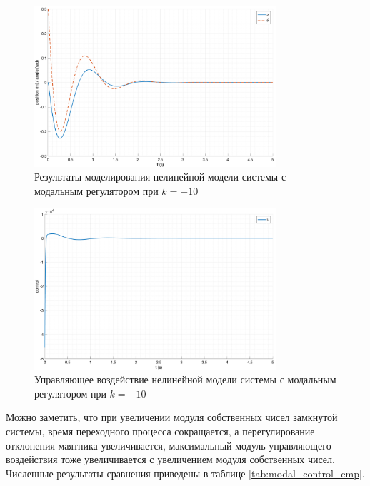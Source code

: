 \begin{figure}[ht!]
    \centering
    \includegraphics[width=0.8\textwidth]{media/plots/modal_controllers/out_4.png}
    \caption{Результаты моделирования нелинейной модели системы с модальным регулятором при $k = -10$}
    \label{fig:modal_controlers_4_out}
\end{figure}
\begin{figure}[ht!]
    \centering
    \includegraphics[width=0.8\textwidth]{media/plots/modal_controllers/u_4.png}
    \caption{Управляющее воздействие нелинейной модели системы с модальным регулятором при $k = -10$}
    \label{fig:modal_controlers_4_u}
\end{figure}
Можно заметить, что при увеличении модуля собственных чисел замкнутой системы, время переходного процесса
сокращается, а перегулирование отклонения маятника увеличивается, максимальный модуль управляющего воздействия 
тоже увеличивается с увеличением модуля собственных чисел. Численные результаты сравнения приведены в таблице \ref{tab:modal_control_cmp}. 

